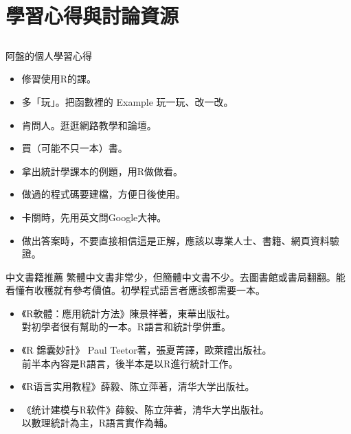 \documentclass[12pt, aspectratio=43]{beamer}
\begin{document}
\section{學習心得與討論資源}\subsection{}

\begin{frame}{阿盤的個人學習心得}
\begin{itemize}
\item 修習使用R的課。
\item 多「玩」。把函數裡的 Example 玩一玩、改一改。
\item 肯問人。逛逛網路教學和論壇。
\item 買（可能不只一本）書。
\item 拿出統計學課本的例題，用R做做看。
\item 做過的程式碼要建檔，方便日後使用。
\item 卡關時，先用英文問Google大神。
\item 做出答案時，不要直接相信這是正解，應該以專業人士、書籍、網頁資料驗證。
\end{itemize}
\end{frame}


\begin{frame}{中文書籍推薦}
繁體中文書非常少，但簡體中文書不少。去圖書館或書局翻翻。能看懂有收穫就有參考價值。初學程式語言者應該都需要一本。
\begin{itemize}
\item 《R軟體：應用統計方法》陳景祥著，東華出版社。\\ 對初學者很有幫助的一本。R語言和統計學併重。
\item 《R 錦囊妙計》 Paul Teetor著，張夏菁譯，歐萊禮出版社。\\ 前半本內容是R語言，後半本是以R進行統計工作。
\item {《R语言实用教程》薛毅、陈立萍著，清华大学出版社。}
\item {《统计建模与R软件》薛毅、陈立萍著，清华大学出版社。} \\ 以數理統計為主，R語言實作為輔。
\end{itemize}
\end{frame}
\end{document}
